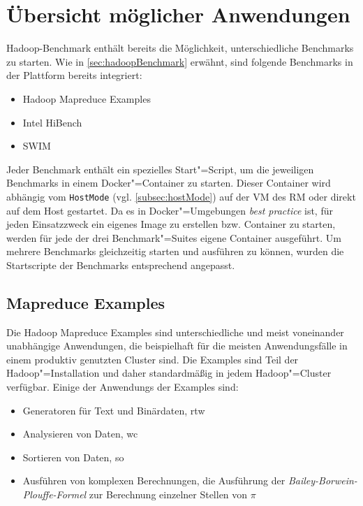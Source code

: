 \section{Übersicht möglicher Anwendungen}
\label{sec:appOverview}

Hadoop-Benchmark enthält bereits die Möglichkeit, unterschiedliche Benchmarks zu starten.
Wie in \cref{sec:hadoopBenchmark} erwähnt, sind folgende Benchmarks in der Plattform bereits integriert:

\begin{itemize}
    \item Hadoop Mapreduce Examples
    \item Intel HiBench
    \item \gls{SWIM}
\end{itemize}

Jeder Benchmark enthält ein spezielles Start"=Script, um die jeweiligen Benchmarks in einem Docker"=Container zu starten.
Dieser \gls{Container} wird abhängig vom \texttt{HostMode} (vgl. \cref{subsec:hostMode}) auf der VM des \gls{RM} oder direkt auf dem Host gestartet.
Da es in Docker"=Umgebungen \emph{best practice} ist, für jeden Einsatzzweck ein eigenes Image zu erstellen bzw. \gls{Container} zu starten, werden für jede der drei Benchmark"=Suites eigene \gls{Container} ausgeführt.
Um mehrere Benchmarks gleichzeitig starten und ausführen zu können, wurden die Startscripte der Benchmarks entsprechend angepasst.

\subsection{Mapreduce Examples}
\label{subsec:mapreduceExamples}

Die Hadoop Mapreduce Examples sind unterschiedliche und meist voneinander unabhängige Anwendungen, die beispielhaft für die meisten Anwendungsfälle in einem produktiv genutzten Cluster sind.
Die Examples sind Teil der Hadoop"=Installation und daher standardmäßig in jedem Hadoop"=Cluster verfügbar.
Einige der \glspl{Anwendung} der Examples sind:

\begin{itemize}
    \item Generatoren für Text und Binärdaten, \zB \acrlong{rtw}
    \item Analysieren von Daten, \zB \acrlong{wc}
    \item Sortieren von Daten, \zB \acrlong{so}
    \item Ausführen von komplexen Berechnungen, \zB die Ausführung der \emph{Bailey-Borwein-Plouffe-Formel} zur Berechnung einzelner Stellen von $\pi$
\end{itemize}

